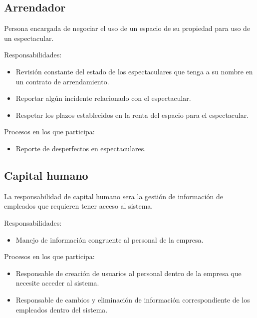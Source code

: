 \begin{Usuario}{\subsection{Arrendador}}{
    Persona encargada de negociar el uso de un espacio de su propiedad para uso de un espectacular.\\
}
    \item[Responsabilidades:] \cdtEmpty
    \begin{itemize}
        \item Revisión constante del estado de los espectaculares que tenga a su nombre en un contrato de arrendamiento.
        \item Reportar algún incidente relacionado con el espectacular.
        \item Respetar los plazos establecidos en la renta del espacio para el espectacular.
    \end{itemize}
    
    \item[Procesos en los que participa:] \cdtEmpty
    \begin{itemize}
        \item Reporte de desperfectos en espectaculares.
    \end{itemize}
\end{Usuario}

\begin{Usuario}{\subsection{Capital humano}}{
La responsabilidad de capital humano sera la gestión de información de empleados que requieren tener acceso al sistema.
}

\item[Responsabilidades:]\cdtEmpty
\begin{itemize}
    \item Manejo de información congruente al personal de la empresa.
\end{itemize}
\item[Procesos en los que participa:]\cdtEmpty
\begin{itemize}
    \item Responsable de creación de usuarios al personal dentro de la empresa que necesite acceder al sistema.
    \item Responsable de cambios y eliminación de información correspondiente de los empleados dentro del sistema.
\end{itemize}
\end{Usuario}

